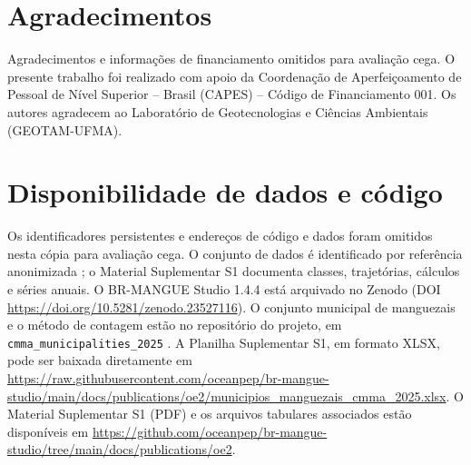 \documentclass[12pt,a4paper]{article}
\begin{document}
\section*{Agradecimentos}
\ifdefined\VersaoCega
Agradecimentos e informações de financiamento omitidos para avaliação cega.
\else
O presente trabalho foi realizado com apoio da Coordenação de Aperfeiçoamento de Pessoal de Nível Superior -- Brasil (CAPES) -- Código de Financiamento 001. Os autores agradecem ao Laboratório de Geotecnologias e Ciências Ambientais (GEOTAM-UFMA).
\fi

\section*{Disponibilidade de dados e código}
\ifdefined\VersaoCega
Os identificadores persistentes e endereços de código e dados foram omitidos nesta cópia para avaliação cega. O conjunto de dados é identificado por referência anonimizada \citep{dados2026}; o Material Suplementar S1 documenta classes, trajetórias, cálculos e séries anuais.
\else
O BR-MANGUE Studio 1.4.4 está arquivado no Zenodo (DOI \url{https://doi.org/10.5281/zenodo.23527116}). O conjunto municipal de manguezais e o método de contagem estão no repositório do projeto, em \texttt{cmma\_municipalities\_2025} \citep{dados2026}. A Planilha Suplementar S1, em formato XLSX, pode ser baixada diretamente em \url{https://raw.githubusercontent.com/oceanpep/br-mangue-studio/main/docs/publications/oe2/municipios_manguezais_cmma_2025.xlsx}. O Material Suplementar S1 (PDF) e os arquivos tabulares associados estão disponíveis em \url{https://github.com/oceanpep/br-mangue-studio/tree/main/docs/publications/oe2}.
\fi
\end{document}
